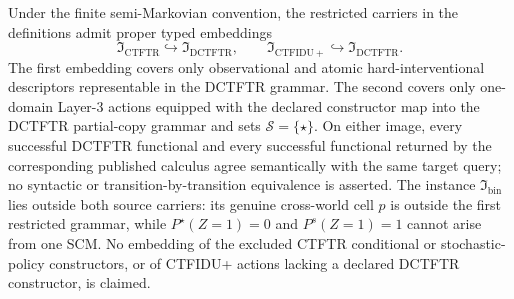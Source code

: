 Under the finite semi-Markovian convention, the restricted carriers in the definitions admit proper typed embeddings
\[
\mathfrak I_{\mathrm{CTFTR}}\hookrightarrow\mathfrak I_{\mathrm{DCTFTR}},
\qquad
\mathfrak I_{\mathrm{CTFIDU+}}\hookrightarrow\mathfrak I_{\mathrm{DCTFTR}}.
\]
The first embedding covers only observational and atomic hard-interventional descriptors representable in the DCTFTR grammar. The second covers only one-domain Layer-3 actions equipped with the declared constructor map into the DCTFTR partial-copy grammar and sets \(\mathcal S=\{\star\}\). On either image, every successful DCTFTR functional and every successful functional returned by the corresponding published calculus agree semantically with the same target query; no syntactic or transition-by-transition equivalence is asserted. The instance \(\mathfrak I_{\mathrm{bin}}\) lies outside both source carriers: its genuine cross-world cell \(p\) is outside the first restricted grammar, while \(P^\star(Z=1)=0\) and \(P^s(Z=1)=1\) cannot arise from one SCM. No embedding of the excluded CTFTR conditional or stochastic-policy constructors, or of CTFIDU+ actions lacking a declared DCTFTR constructor, is claimed.